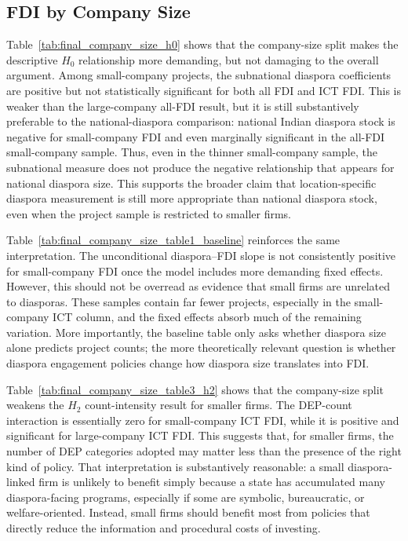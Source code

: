 \documentclass[12pt]{article}
\let\oldsubsection\subsection
\renewcommand{\subsection}{\FloatBarrier\oldsubsection}
\begin{document}
\FloatBarrier
\subsection{FDI by Company Size} \label{ss:comp size}


Table~\ref{tab:final_company_size_h0} shows that the company-size split makes the descriptive $H_0$ relationship more demanding, but not damaging to the overall argument. Among small-company projects, the subnational diaspora coefficients are positive but not statistically significant for both all FDI and ICT FDI. This is weaker than the large-company all-FDI result, but it is still substantively preferable to the national-diaspora comparison: national Indian diaspora stock is negative for small-company FDI and even marginally significant in the all-FDI small-company sample. Thus, even in the thinner small-company sample, the subnational measure does not produce the negative relationship that appears for national diaspora size. This supports the broader claim that location-specific diaspora measurement is still more appropriate than national diaspora stock, even when the project sample is restricted to smaller firms.



Table~\ref{tab:final_company_size_table1_baseline} reinforces the same interpretation. The unconditional diaspora--FDI slope is not consistently positive for small-company FDI once the model includes more demanding fixed effects. However, this should not be overread as evidence that small firms are unrelated to diasporas. These samples contain far fewer projects, especially in the small-company ICT column, and the fixed effects absorb much of the remaining variation. More importantly, the baseline table only asks whether diaspora size alone predicts project counts; the more theoretically relevant question is whether diaspora engagement policies change how diaspora size translates into FDI.


Table~\ref{tab:final_company_size_table3_h2} shows that the company-size split weakens the $H_2$ count-intensity result for smaller firms. The DEP-count interaction is essentially zero for small-company ICT FDI, while it is positive and significant for large-company ICT FDI. This suggests that, for smaller firms, the number of DEP categories adopted may matter less than the presence of the right kind of policy. That interpretation is substantively reasonable: a small diaspora-linked firm is unlikely to benefit simply because a state has accumulated many diaspora-facing programs, especially if some are symbolic, bureaucratic, or welfare-oriented. Instead, small firms should benefit most from policies that directly reduce the information and procedural costs of investing.
\end{document}
